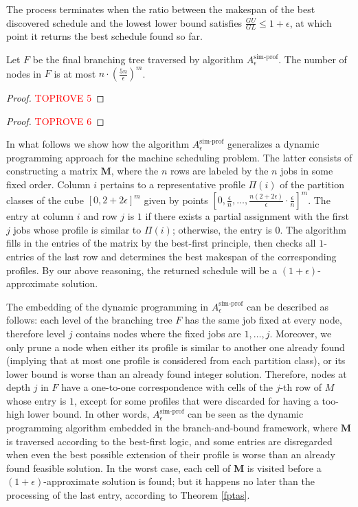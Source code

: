 \documentclass[a4paper,UKenglish,cleveref, autoref, thm-restate, pdfa]{lipics-v2021}
\theoremstyle{plain}
\begin{document}
The process terminates when the ratio between the makespan of the best discovered schedule and the lowest lower bound satisfies $\frac{GU}{GL} \le 1+ \epsilon$, at which point it returns the best schedule found so far.

\begin{lmm}\label{fptas_size}
    Let $F$ be the final branching tree traversed by algorithm $A^{\text{sim-prof}}_{\epsilon}$. The number of nodes in $F$ is at most $n\cdot \left(\frac{5n}{\epsilon}\right)^m$.
\end{lmm}

\begin{proof}\textcolor{red}{TOPROVE 5}\end{proof}

\begin{proof}\textcolor{red}{TOPROVE 6}\end{proof}

In what follows we show how the algorithm $A^{\text{sim-prof}}_{\epsilon}$ generalizes a dynamic programming approach for the machine scheduling problem. The latter consists of constructing a matrix $\bm{M}$, where the $n$ rows are labeled by the $n$ jobs in some fixed order. Column $i$ pertains to a representative profile $\Pi(i)$ of the partition classes of the cube $[0,2+2\epsilon]^m$ given by points $[0, \frac{\epsilon}{n}, \ldots, \frac{n(2+2\epsilon)}{\epsilon}\cdot \frac{\epsilon}{n}]^m$. The entry at column $i$ and row $j$ is $1$ if there exists a partial assignment with the first $j$ jobs whose profile is similar to $\Pi(i)$; otherwise, the entry is $0$. The algorithm fills in the entries of the matrix by the best-first principle, then checks all $ 1$-entries of the last row and determines the best makespan of the corresponding profiles. By our above reasoning, the returned schedule will be a $(1+\epsilon)$-approximate solution.

The embedding of the dynamic programming in $A^{\text{sim-prof}}_{\epsilon}$ can be described as follows: each level of the branching tree $F$ has the same job fixed at every node, therefore level $j$ contains nodes where the fixed jobs are $1,\ldots, j$. Moreover, we only prune a node when either its profile is similar to another one already found (implying that at most one profile is considered from each partition class), or its lower bound is worse than an already found integer solution. Therefore, nodes at depth $j$ in $F$ have a one-to-one correspondence with cells of the $j$-th row of $M$ whose entry is $1$, except for some profiles that were discarded for having a too-high lower bound. In other words, $A^{\text{sim-prof}}_{\epsilon}$ can be seen as the dynamic programming algorithm embedded in the branch-and-bound framework, where $\bm{M}$ is traversed according to the best-first logic, and some entries are disregarded when even the best possible extension of their profile is worse than an already found feasible solution. In the worst case, each cell of $\bm{M}$ is visited before a $(1+\epsilon)$-approximate solution is found; but it happens no later than the processing of the last entry, according to Theorem \ref{fptas}.
\end{document}
